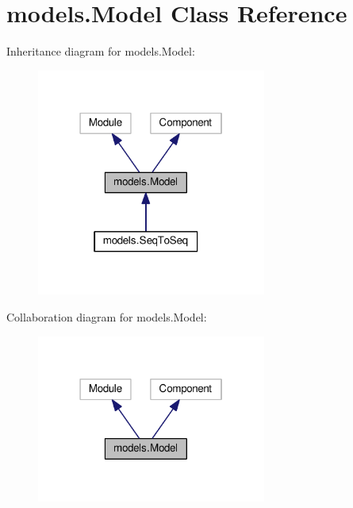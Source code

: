 \hypertarget{classmodels_1_1Model}{}\section{models.\+Model Class Reference}
\label{classmodels_1_1Model}


Inheritance diagram for models.\+Model\+:
\nopagebreak
\begin{figure}[H]
\begin{center}
\leavevmode
\includegraphics[width=214pt]{classmodels_1_1Model__inherit__graph}
\end{center}
\end{figure}


Collaboration diagram for models.\+Model\+:
\nopagebreak
\begin{figure}[H]
\begin{center}
\leavevmode
\includegraphics[width=214pt]{classmodels_1_1Model__coll__graph}
\end{center}
\end{figure}
